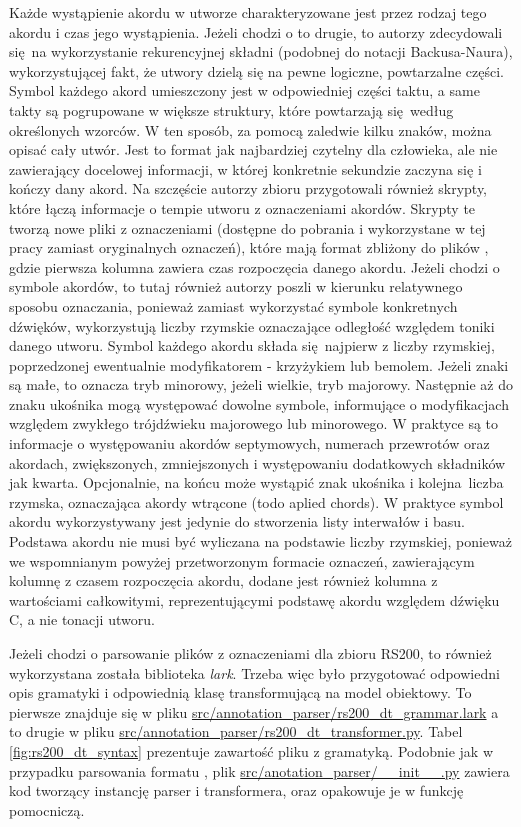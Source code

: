 Każde wystąpienie akordu w utworze charakteryzowane jest przez rodzaj tego akordu i czas jego
wystąpienia. Jeżeli chodzi o to drugie, to autorzy zdecydowali się na wykorzystanie rekurencyjnej
składni (podobnej do notacji Backusa-Naura), wykorzystującej fakt, że utwory dzielą się na pewne
logiczne, powtarzalne części. Symbol każdego akord umieszczony jest w odpowiedniej części taktu, a
same takty są pogrupowane w większe struktury, które powtarzają się według określonych wzorców. W
ten sposób, za pomocą zaledwie kilku znaków, można opisać cały utwór. Jest to format jak najbardziej
czytelny dla człowieka, ale nie zawierający docelowej informacji, w której konkretnie sekundzie
zaczyna się i kończy dany akord. Na szczęście autorzy zbioru przygotowali również skrypty, które
łączą informacje o tempie utworu z oznaczeniami akordów. Skrypty te tworzą nowe pliki z oznaczeniami
(dostępne do pobrania i wykorzystane w tej pracy zamiast oryginalnych oznaczeń), które mają format
zbliżony do plików , gdzie pierwsza kolumna zawiera czas rozpoczęcia danego akordu. Jeżeli
chodzi o symbole akordów, to tutaj również autorzy poszli w kierunku relatywnego sposobu oznaczania,
ponieważ zamiast wykorzystać symbole konkretnych dźwięków, wykorzystują liczby rzymskie oznaczające
odległość względem toniki danego utworu.  Symbol każdego akordu składa się najpierw z liczby
rzymskiej, poprzedzonej ewentualnie modyfikatorem - krzyżykiem lub bemolem. Jeżeli znaki są małe, to
oznacza tryb minorowy, jeżeli wielkie, tryb majorowy. Następnie aż do znaku ukośnika mogą występować
dowolne symbole, informujące o modyfikacjach względem zwykłego trójdźwieku majorowego lub
minorowego. W praktyce są to informacje o występowaniu akordów septymowych, numerach przewrotów oraz
akordach, zwiększonych, zmniejszonych i występowaniu dodatkowych składników jak kwarta. Opcjonalnie,
na końcu może wystąpić znak ukośnika i kolejna liczba rzymska, oznaczająca akordy wtrącone (todo
aplied chords). W praktyce symbol akordu wykorzystywany jest jedynie do stworzenia listy interwałów
i basu.  Podstawa akordu nie musi być wyliczana na podstawie liczby rzymskiej, ponieważ we
wspomnianym powyżej przetworzonym formacie oznaczeń, zawierającym kolumnę z czasem rozpoczęcia
akordu, dodane jest również kolumna z wartościami całkowitymi, reprezentującymi podstawę akordu
względem dźwięku C, a nie tonacji utworu.

Jeżeli chodzi o parsowanie plików z oznaczeniami dla zbioru RS200, to również wykorzystana została
biblioteka \emph{lark}. Trzeba więc było przygotować odpowiedni opis gramatyki i odpowiednią klasę
transformującą na model obiektowy. To pierwsze znajduje się w pliku
\url{src/annotation\_parser/rs200\_dt\_grammar.lark} a to drugie w pliku
\url{src/annotation\_parser/rs200\_dt\_transformer.py}. Tabel \ref{fig:rs200_dt_syntax} prezentuje
zawartość pliku z gramatyką. Podobnie jak w przypadku parsowania formatu , plik
\url{src/anotation\_parser/\_\_init\_\_.py} zawiera kod tworzący instancję parser i transformera, oraz
opakowuje je w funkcję pomocniczą.

